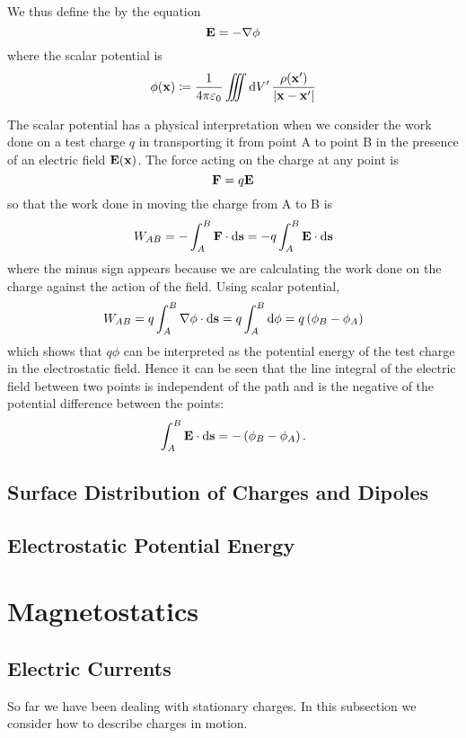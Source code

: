 We thus define the  by the equation
\begin{equation}
\vb{E}=-\nabla\phi
\end{equation}
where the scalar potential is
\begin{equation}
\phi(\vb{x})\coloneqq\frac{1}{4\pi\varepsilon_0}\iiint\dd{V^\prime}\frac{\rho(\vb{x}^\prime)}{|\vb{x}-\vb{x}^\prime|}
\end{equation}

The scalar potential has a physical interpretation when we consider the work done on a test charge $q$ in transporting it from point A to point B in the presence of an electric field $\vb{E}(\vb{x})$. The force acting on the charge at any point is 
\[\vb{F}=q\vb{E}\]
so that the work done in moving the charge from A to B is
\[W_{AB}=-\int_{A}^{B}\vb{F}\cdot\dd{\vb{s}}=-q\int_{A}^{B}\vb{E}\cdot\dd{\vb{s}}\]
where the minus sign appears because we are calculating the work done on the charge against the action of the field. Using scalar potential,
\[W_{AB}=q\int_{A}^{B}\nabla\phi\cdot\dd{\vb{s}}=q\int_{A}^{B}\dd{\phi}=q\left(\phi_B-\phi_A\right)\]
which shows that $q\phi$ can be interpreted as the potential energy of the test charge in the electrostatic field. Hence it can be seen that the line integral of the electric field between two points is independent of the path and is the negative of the potential difference between the points:
\begin{equation}
\int_{A}^{B}\vb{E}\cdot\dd{\vb{s}}=-\left(\phi_B-\phi_A\right).
\end{equation}



\subsection{Surface Distribution of Charges and Dipoles}
\subsection{Electrostatic Potential Energy}



\section{Magnetostatics}
\subsection{Electric Currents}
So far we have been dealing with stationary charges. In this subsection we consider how to describe charges in motion.

